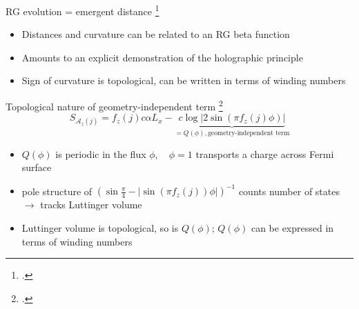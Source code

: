 \documentclass[8pt,aspectratio=169]{beamer}
\newcommand{\nitem}{\item[\ding{51}]}
\begin{document}
\begin{frame}{RG evolution = emergent distance}
	\footcite{maldacena1999large,ryu2006aspects,holzhey_1994}
\begin{itemize}
	\nitem Distances and curvature can be related to an RG \alert{beta function}\\[10pt]
	\nitem Amounts to an \alert{explicit demonstration} of the holographic principle\\[10pt]
	\nitem Sign of curvature is \alert{topological}, can be written in terms of winding numbers\\[10pt]
\end{itemize}
	
\end{frame}

\begin{frame}{Topological nature of geometry-independent term}
	\footcite{luttinger1960ground,luttinger1960fermi,oshikawa2000topological,seki2017topological,anirbanurg1,Heath_2020}
	\[S_{\mathcal{A}_z(j)} = f_z(j) c \alpha L_x - \underbrace{c \log \big|2\sin\left(\pi f_z(j)\phi\right)\big|}_{=Q(\phi),\text{geometry-independent term}}\]
	\begin{itemize}
	\nitem \(Q(\phi)\) is periodic in the flux \(\phi\), ~ \(\phi=1\) transports a charge across Fermi surface\\[10pt]
	\nitem pole structure of \(\left(\sin \frac{\pi}{4} - |\sin\left(\pi f_z(j)\right)\phi|\right)^{-1}\) counts number of states \(\longrightarrow\) tracks Luttinger volume\\[10pt]
	\nitem Luttinger volume is topological, so is \(Q(\phi)\); \(Q(\phi)\) can be expressed in terms of winding numbers
	\end{itemize}
	
\end{frame}
\end{document}
